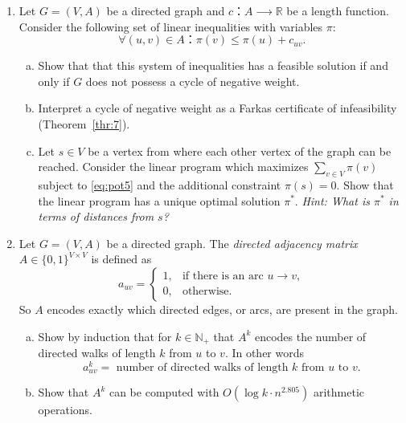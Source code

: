 \begin{enumerate}
\item  \label{Ex:Node-Pot} Let $G = (V,A)$ be a directed graph and $c：A ⟶ ℝ$ be a length function. Consider the following set of linear inequalities with variables $π$:
  \begin{equation}\label{eq:pot5}
    ∀ (u,v) ∈ A ： π(v) ≤ π(u) + c_{uv}. 
  \end{equation}
  \begin{enumerate}[a)]
  \item   Show that that this system of inequalities has a feasible solution if and only if $G$ does not possess a cycle of negative weight.
  \item  Interpret a cycle of negative weight as a Farkas certificate of infeasibility (Theorem~\ref{thr:7}).
  \item Let $s ∈ V$ be a vertex from where each other vertex of the graph can be reached.  Consider the linear program which maximizes $∑_{v ∈ V} π(v) $ subject to \eqref{eq:pot5} and the additional constraint $π(s) = 0$. Show that the linear program has a unique optimal solution $π^*$. \emph{Hint: What is $π^*$ in terms of distances from $s$? }
\end{enumerate}

\item \label{ex:count:paths} Let $G = (V,A)$ be a directed graph. The \emph{directed adjacency matrix} $A ∈ \{0,1\}^{V × V}$ is  defined as 
\[
a_{uv} =
\begin{cases}
1, & \text{if there is an arc } u\to v,\\
0, & \text{otherwise.}
\end{cases}
\]
So \(A\) encodes exactly which directed edges, or arcs, are present in the graph.
\begin{enumerate}[a)] 
\item Show by induction that for  $k ∈ ℕ_+$ that  $A^k$ encodes the number of directed walks of length $k$ from $u$ to $v$. In other words
  \[
a^k_{uv} =  \text{ number of directed walks of length $k$ from $u$ to $v$.} 
\]
\item Show that $A^k$ can be computed with $O(\log k ⋅ n^{2.805}  )$ arithmetic operations.
\end{enumerate}


\end{enumerate}
